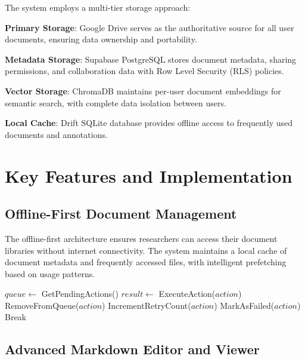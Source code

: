 \documentclass[conference]{IEEEtran}
\begin{document}
The system employs a multi-tier storage approach:

\textbf{Primary Storage}: Google Drive serves as the authoritative source for all user documents, ensuring data ownership and portability.

\textbf{Metadata Storage}: Supabase PostgreSQL stores document metadata, sharing permissions, and collaboration data with Row Level Security (RLS) policies.

\textbf{Vector Storage}: ChromaDB maintains per-user document embeddings for semantic search, with complete data isolation between users.

\textbf{Local Cache}: Drift SQLite database provides offline access to frequently used documents and annotations.

\section{Key Features and Implementation}

\subsection{Offline-First Document Management}

The offline-first architecture ensures researchers can access their document libraries without internet connectivity. The system maintains a local cache of document metadata and frequently accessed files, with intelligent prefetching based on usage patterns.

\begin{algorithm}[htbp]
\caption{Offline Sync Algorithm}
\begin{algorithmic}[1]
    \State $queue \gets$ GetPendingActions()
            \State $result \gets$ ExecuteAction($action$)
                \State RemoveFromQueue($action$)
            \Else
                \State IncrementRetryCount($action$)
                    \State MarkAsFailed($action$)
                \EndIf
            \EndIf
        \Else
            \State Break
        \EndIf
    \EndFor
\EndProcedure
\end{algorithmic}
\end{algorithm}

\subsection{Advanced Markdown Editor and Viewer}
\end{document}
